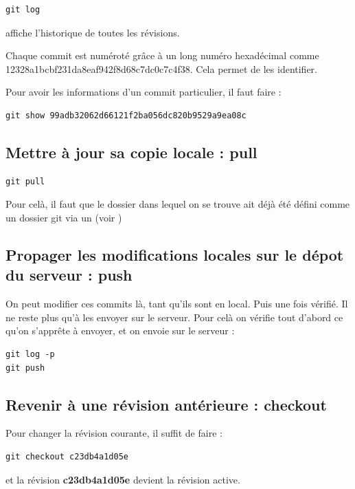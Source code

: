 \documentclass[a4paper,twoside]{article}
\begin{document}
\begin{verbatim}
git log
\end{verbatim}
affiche l'historique de toutes les révisions.

\begin{attention}
Chaque commit est numéroté grâce à un long numéro hexadécimal comme 12328a1bcbf231da\-8eaf942f8d68c7dc0c7c4f38. Cela permet de les identifier.
\end{attention}

Pour avoir les informations d'un commit particulier, il faut faire :
\begin{verbatim}
git show 99adb32062d66121f2ba056dc820b9529a9ea08c
\end{verbatim}

\subsection{Mettre à jour sa copie locale : pull} 
\begin{verbatim}
git pull
\end{verbatim}

Pour celà, il faut que le dossier dans lequel on se trouve ait déjà été défini comme un dossier git via un  (voir )

\subsection{Propager les modifications locales sur le dépot du serveur : push}
On peut modifier ces commits là, tant qu'ils sont en local. Puis une fois vérifié. Il ne reste plus qu'à les envoyer sur le serveur. Pour celà on vérifie tout d'abord ce qu'on s'apprête à envoyer, et on envoie sur le serveur : 
\begin{verbatim}
git log -p
git push
\end{verbatim}

\subsection{Revenir à une révision antérieure : checkout}\label{sec:revenir_en_arriere}
Pour changer la révision courante, il suffit de faire : 
\begin{verbatim}
git checkout c23db4a1d05e
\end{verbatim}
et la révision \textbf{c23db4a1d05e} devient la révision active. 
\end{document}
